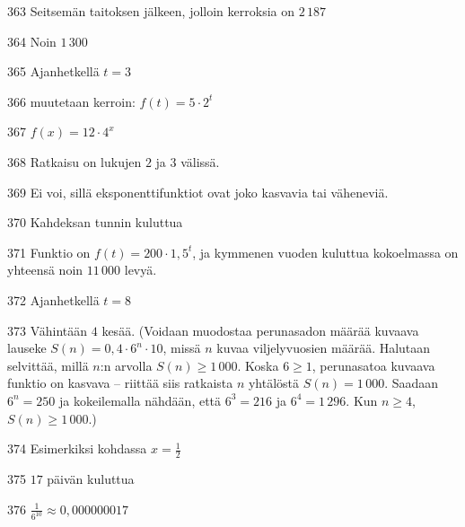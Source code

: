 \begin{Vastaus}{363}
Seitsemän taitoksen jälkeen, jolloin kerroksia on $2\,187$
\end{Vastaus}
\begin{Vastaus}{364}
Noin $1\,300$
\end{Vastaus}
\begin{Vastaus}{365}
Ajanhetkellä $t=3$ %
\end{Vastaus}
\begin{Vastaus}{366}
muutetaan kerroin: $f(t) = 5 \cdot 2^t$
\end{Vastaus}
\begin{Vastaus}{367}
$f(x)=12\cdot 4^{x}$
\end{Vastaus}
\begin{Vastaus}{368}
Ratkaisu on lukujen $2$ ja $3$ välissä.
\end{Vastaus}
\begin{Vastaus}{369}
Ei voi, sillä eksponenttifunktiot ovat joko kasvavia tai väheneviä.
\end{Vastaus}
\begin{Vastaus}{370}
Kahdeksan tunnin kuluttua
\end{Vastaus}
\begin{Vastaus}{371}
Funktio on $f(t) = 200 \cdot 1,5^t$, ja kymmenen vuoden kuluttua kokoelmassa on yhteensä noin $11\,000$ levyä.
\end{Vastaus}
\begin{Vastaus}{372}
Ajanhetkellä $t = 8$
\end{Vastaus}
\begin{Vastaus}{373}
	Vähintään $4$ kesää. (Voidaan muodostaa perunasadon määrää kuvaava lauseke $S(n)=0,4\cdot6^n\cdot10$, missä $n$ kuvaa viljelyvuosien määrää. Halutaan selvittää, millä $n$:n arvolla $S(n)\geq1\,000$. Koska $6\geq1$, perunasatoa kuvaava funktio on kasvava -- riittää siis ratkaista $n$ yhtälöstä $S(n)=1\,000$. Saadaan $6^n=250$ ja kokeilemalla nähdään, että $6^3=216$ ja $6^4=1\,296$. Kun $n\geq4$, $S(n)\geq1\,000$.)
	
\end{Vastaus}
\begin{Vastaus}{374}
Esimerkiksi kohdassa $x = \frac{1}{2}$
	
\end{Vastaus}
\begin{Vastaus}{375}
$17$ päivän kuluttua
\end{Vastaus}
\begin{Vastaus}{376}
$ \frac{1}{6^{10}}\approx0,000000017$
\end{Vastaus}
